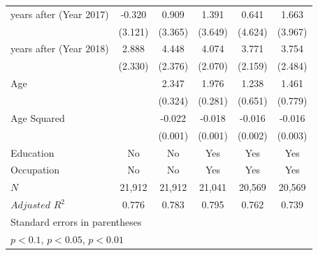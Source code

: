 \documentclass[serif, aspectratio=169]{beamer}
\begin{document}
\begin{frame}
\begin{table}[htbp]
\begin{tabular}{@{\extracolsep{5pt}}lccccc}
\addlinespace
6 years after (Year 2017)&      -0.320         &       0.909         &       1.391         &       0.641         &       1.663         \\
            &     (3.121)         &     (3.365)         &     (3.649)         &     (4.624)         &     (3.967)         \\
\addlinespace
7 years after (Year 2018)&       2.888         &       4.448\sym{*}  &       4.074\sym{*}  &       3.771\sym{*}  &       3.754         \\
            &     (2.330)         &     (2.376)         &     (2.070)         &     (2.159)         &     (2.484)         \\
\addlinespace
Age         &                     &       2.347\sym{***}&       1.976\sym{***}&       1.238\sym{*}  &       1.461\sym{*}  \\
            &                     &     (0.324)         &     (0.281)         &     (0.651)         &     (0.779)         \\
\addlinespace
Age Squared &                     &      -0.022\sym{***}&      -0.018\sym{***}&      -0.016\sym{***}&      -0.016\sym{***}\\
            &                     &     (0.001)         &     (0.001)         &     (0.002)         &     (0.003)         \\
\midrule
Education   &          No         &          No         &         Yes         &         Yes         &         Yes         \\
Occupation  &          No         &          No         &         Yes         &         Yes         &         Yes         \\
$\textit{N}$&      21,912         &      21,912         &      21,041         &      20,569         &      20,569         \\
$\textit{Adjusted R}^2$&       0.776         &       0.783         &       0.795         &       0.762         &       0.739         \\
\bottomrule
\multicolumn{6}{l}{\tiny Standard errors in parentheses}\\
\multicolumn{6}{l}{\tiny \sym{*} \(p<0.1\), \sym{**} \(p<0.05\), \sym{***} \(p<0.01\)}\\


\end{tabular}

\label{table:Monthly_Income}

\end{table}

\end{frame}
\end{document}
